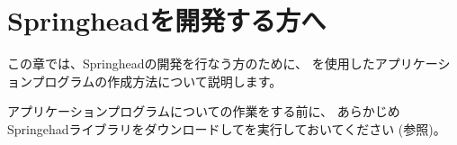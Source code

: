 \newpage
\section{Springheadを開発する方へ}
\label{sec:ForDevelopper}

\noindent
この章では、Springheadの開発を行なう方のために、
\cmake を使用したアプリケーションプログラムの作成方法について説明します。

\medskip
アプリケーションプログラムについての作業をする前に、
あらかじめSpringehadライブラリをダウンロードして\cmake を実行しておいてください
(参照)。

